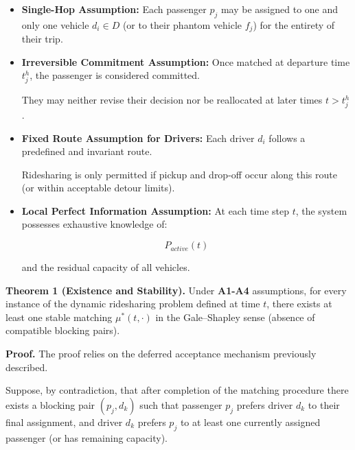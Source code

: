 \documentclass[11pt,a4paper]{article}
\begin{document}
\begin{itemize}
    \item[\textbf{A1.}] \textbf{Single-Hop Assumption:}
    Each passenger $p_j$ may be assigned to one and only one vehicle $d_i\in D$ (or to their phantom vehicle $f_j$) for the entirety of their trip.

\item[\textbf{A2}.] \textbf{Irreversible Commitment Assumption:}
    Once matched at departure time $t_j^h$, the passenger is considered committed.

    They may neither revise their decision nor be reallocated at later times $t>t_j^h$.

\item[\textbf{A3}.] \textbf{Fixed Route Assumption for Drivers:}
    Each driver $d_i$ follows a predefined and invariant route.

    Ridesharing is only permitted if pickup and drop-off occur along this route (or within acceptable detour limits).

\item[\textbf{A4.}] \textbf{Local Perfect Information Assumption:}
    At each time step $t$, the system possesses exhaustive knowledge of:

$$
P_{active}(t)
$$

and the residual capacity of all vehicles.
\end{itemize}

\textbf{Theorem 1 (Existence and Stability).}
Under \textbf{A1-A4} assumptions, for every instance of the dynamic ridesharing problem defined at time $t$, there exists at least one stable matching $\mu^*(t,\cdot)$ in the Gale--Shapley sense (absence of compatible blocking pairs).

\textbf{Proof.}
The proof relies on the deferred acceptance mechanism previously described.

Suppose, by contradiction, that after completion of the matching procedure there exists a blocking pair $(p_j,d_k)$ such that passenger $p_j$ prefers driver $d_k$ to their final assignment, and driver $d_k$ prefers $p_j$ to at least one currently assigned passenger (or has remaining capacity).
\end{document}
